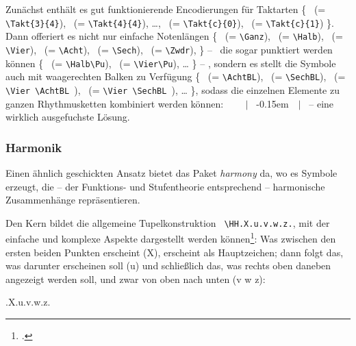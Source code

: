 Zunächst enthält es gut funktionierende Encodierungen für Taktarten \{ 
 \ (= \texttt{\small \textbackslash{Takt}\{3\}\{4\}}),
 \ (= \texttt{\small \textbackslash{Takt}\{4\}\{4\}}),
\ldots,
 \ (= \texttt{\small \textbackslash{Takt}\{c\}\{0\}}),
 \ (= \texttt{\small \textbackslash{Takt}\{c\}\{1\}})
\}.
Dann offeriert es nicht nur einfache Notenlängen \{
\Ganz \ (= \texttt{\small \textbackslash{Ganz}}),
\Halb \ (= \texttt{\small \textbackslash{Halb}}),
\Vier \ (= \texttt{\small \textbackslash{Vier}}),
\Acht \ (= \texttt{\small \textbackslash{Acht}}),
\Sech \ (= \texttt{\small \textbackslash{Sech}}),
\Zwdr \ (= \texttt{\small \textbackslash{Zwdr}}),
\}  -- \ die sogar punktiert werden können 
\{
\Halb\Pu \ (= \texttt{\small \textbackslash{Halb}\textbackslash{Pu}}),
\Vier\Pu \ (= \texttt{\small \textbackslash{Vier}\textbackslash{Pu}}),
\ldots
\}
-- ,
sondern es stellt die Symbole auch mit waagerechten Balken zu Verfügung
\{
\AchtBL \ (= \texttt{\small \textbackslash{AchtBL}}),
\SechBL \ (= \texttt{\small \textbackslash{SechBL}}),
\Vier\AchtBL \ (= \texttt{\small \textbackslash{Vier} \textbackslash{AchtBL} }),
\Vier\SechBL \ (= \texttt{\small \textbackslash{Vier} \textbackslash{SechBL} }),
\ldots
\}, 
sodass die einzelnen Elemente zu ganzen Rhythmusketten kombiniert werden können: 
 \Vier \ \Vier\AchtBL \ \Vier\Pu \ \Acht \ $|$ 
\AchtBR\Pu \SechBl \ \AchtBR\kern-0.15em\SechBR\Vier \ \SechBr\Vier\SechBl \ $|$
\ -- eine wirklich ausgefuchste Lösung.

\subsubsection{\small Harmonik}

Einen ähnlich geschickten Ansatz bietet das Paket \textit{harmony} da, wo es
Symbole erzeugt, die -- der Funktions- und Stufentheorie entsprechend --
harmonische Zusammenhänge repräsentieren.

Den Kern bildet die allgemeine Tupelkonstruktion \texttt{\small
\textbackslash{HH.X.u.v.w.z.}}, mit der einfache und komplexe Aspekte
dargestellt werden können\footcite[vgl. dazu][2ff]{WegWeg2007a}: Was zwischen
den ersten beiden Punkten erscheint (X), erscheint als Hauptzeichen; dann folgt
das, was darunter erscheinen soll (u) und schließlich das, was rechts oben
daneben angezeigt werden soll, und zwar von oben nach unten (v w z):

\begin{center}
\HH.X.u.v.w.z.
\end{center}

